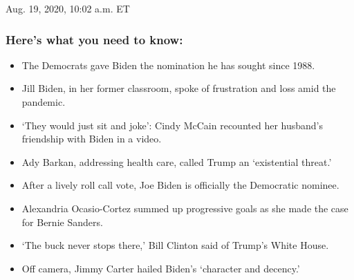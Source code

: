 Aug. 19, 2020, 10:02 a.m. ET

\hypertarget{heres-what-you-need-to-know}{%
\subsubsection{Here's what you need to
know:}\label{heres-what-you-need-to-know}}

\begin{itemize}
\item
  \protect\hyperlink{the-democrats-gave-biden-the-nomination-he-has-sought-since-1988}{}

  The Democrats gave Biden the nomination he has sought since 1988.
\item
  \protect\hyperlink{jill-biden-returns-to-her-old-classroom-to-deliver-convention-speech}{}

  Jill Biden, in her former classroom, spoke of frustration and loss
  amid the pandemic.
\item
  \protect\hyperlink{they-would-just-sit-and-joke-cindy-mccain-recounted-her-husbands-friendship-with-biden-in-a-video}{}

  `They would just sit and joke': Cindy McCain recounted her husband's
  friendship with Biden in a video.
\item
  \protect\hyperlink{ady-barkan-addressing-health-care-called-trump-an-existential-threat}{}

  Ady Barkan, addressing health care, called Trump an `existential
  threat.'
\item
  \protect\hyperlink{after-a-lively-roll-call-vote-joe-biden-is-officially-the-democratic-nominee}{}

  After a lively roll call vote, Joe Biden is officially the Democratic
  nominee.
\item
  \protect\hyperlink{alexandria-ocasio-cortez-summed-up-progressive-goals-as-she-made-the-case-for-bernie-sanders}{}

  Alexandria Ocasio-Cortez summed up progressive goals as she made the
  case for Bernie Sanders.
\item
  \protect\hyperlink{the-buck-never-stops-there-bill-clinton-said-of-trumps-white-house}{}

  `The buck never stops there,' Bill Clinton said of Trump's White
  House.
\item
  \protect\hyperlink{off-camera-jimmy-carter-hailed-bidens-character-and-decency}{}

  Off camera, Jimmy Carter hailed Biden's `character and decency.'
\end{itemize}


